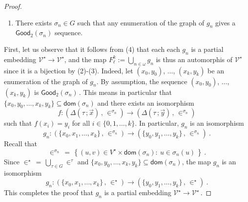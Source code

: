 \documentclass[10pt,a4paper, openany,  oldfontcommands]{memoir}
\newtheorem{open problem} [theorem] {Open Problem}
\begin{document}
\begin{proof}
\begin{enumerate}
\item There exists  $  \sigma_n   \in  G  $  such that   any enumeration of the graph of  $  g_n  $   gives a 
$  \mathsf{Good}_2  \left(  \sigma_n  \right)  $  sequence.  
\end{enumerate}
First,  let us observe that  it follows from (4) that  each   each  $g_n $  is a partial embedding   $   \mathcal{V}^{  \star }   \to      \mathcal{V}^{  \star }   $, 
and the map    $   F^k_{  \ell  }   :=  \bigcup_{ n  \in  \omega  }   g_n     $  is thus an automorphis of     $   \mathcal{V}^{  \star }   $
since it is  a bijection by (2)-(3).  
Indeed,  let  $  (x_0, y_0) $,   $  \ldots  $,  $(x_k, y_k ) $ be an enumeration of the graph of  $  g_n $. 
By assumption,  the sequence  $  (x_0, y_0) $,   $  \ldots  $,  $(x_k, y_k ) $   is  $  \mathsf{Good}_2  \left(   \sigma_n  \right)      \,   $.
This means   in particular  that  $   \lbrace  x_0,  y_0 ,  \ldots  , x_k,  y_k   \rbrace   \subseteq    \mathsf{dom} \left(  \sigma_n   \right)   $  
and     there exists  an isomorphism 
\[
f   :     \left(    \Delta \left(  \tau  \, ;   \vec{x}   \right)    \,  ,   \,   \in^{  \sigma_n }    \right)     \to  
\left(    \Delta \left(  \tau  \, ;   \vec{y}   \right)    \,  ,   \,   \in^{  \sigma_n }    \right)    
\]
such that  $  f   \left(  x_i   \right)  =  y_i  $  for all $  i  \in  \lbrace 0 ,  1,  \ldots  ,  k  \rbrace  $. 
In particular,    $g_n $  is an isomorphism 
\[
g_n :     \left(      \lbrace x_0, x_1,  \ldots , x_k  \rbrace   \,  ,   \,   \in^{  \sigma_n }    \right)     \to  
\left(    \lbrace y_0, y_1,  \ldots , y_k  \rbrace    \,  ,   \,   \in^{  \sigma_n }    \right)    
\          .
\]
Recall that  
\[
\in^{  \sigma_n }  
   \,       =      \,    
  \left\{    (u, v)  \in  V^{  \star }  \times   \mathsf{dom} \left(  \sigma_n   \right)  :    \        u   \in  \sigma_n   (u)      \,         \right\}  
\        .  
\]
Since   $  \in^{  \star }  \,   =   \,   \bigcup_{    \tau   \in  G    }     \in^{  \tau   }      $
and    $   \lbrace  x_0,  y_0 ,  \ldots  , x_k,  y_k   \rbrace   \subseteq    \mathsf{dom} \left(  \sigma_n   \right)   $, 
the map    $  g_n  $  is  an isomorphism   
\[
g_n :     \left(      \lbrace x_0, x_1,  \ldots , x_k  \rbrace   \,  ,   \,   \in^{  \star  }    \right)     \to  
 \left(      \lbrace y_0, y_1,  \ldots , y_k  \rbrace   \,  ,   \,   \in^{  \star  }    \right)    
\          .
\] 
This completes the proof that  $g_n $  is a partial embedding     $   \mathcal{V}^{  \star }   \to      \mathcal{V}^{  \star }       \,   $.










\end{proof}
\end{document}
